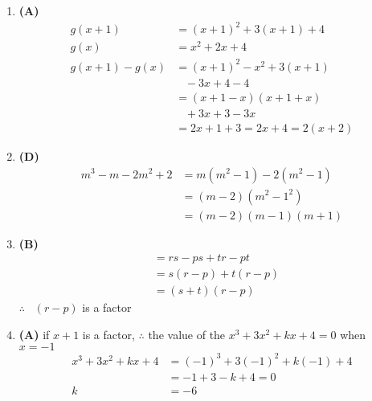 \begin{multicols}{2}
\begin{enumerate}[label={\textbf{\arabic*.}}]
    \item \textbf{(A)} \begin{align*}
        g(x + 1) &= (x + 1) ^2 + 3(x + 1) + 4  \\
        g(x) & = x^2 + 2x + 4 \\
        g(x + 1) - g(x) & = (x+ 1)^2 - x^2 + 3(x+1)  \\
        & \hspace{10pt} - 3x + 4 - 4 \\
        & = (x + 1 - x)(x + 1 + x) \\
        &\hspace{10pt} + 3x + 3 - 3x \\
        & = 2x + 1 + 3 = 2x + 4 = 2(x + 2)
    \end{align*}
    \item \textbf{(D)} \begin{align*} 
        m^3 - m -2m^2 + 2 &= m(m^2 -1) -2 (m^2 -1) \\
        & = (m - 2)(m^2 - 1^2) \\
        & = (m-2)(m-1)(m+1)
    \end{align*}
    \item \textbf{(B)} \begin{align*} 
        & = rs -ps + tr - pt \\
        & = s(r-p) + t(r-p) \\
        & = (s + t)(r-p)
    \end{align*}
    $\therefore \hspace{10pt} (r-p) $ is a factor
    \item \textbf{(A)} if $x + 1$ is a factor, $\therefore$ the value of the $x^3 + 3x^2 + kx + 4 = 0$ when $x = -1$ \\
    \begin{align*}
        x^3 + 3x^2 + kx + 4 &= (-1)^3 + 3(-1)^2 +k(-1) + 4 \\
        & = -1 + 3 -k + 4 = 0 \\
        k & = -6 
    \end{align*}


\end{enumerate}
\end{multicols}
